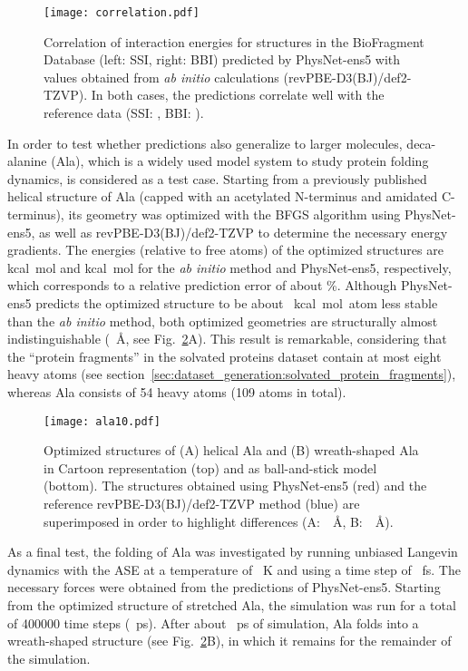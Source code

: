 \documentclass[12pt]{article}
\newcommand{\nn}{PhysNet}
\begin{document}
\begin{figure}[htbp]
\centering
\texttt{[image: correlation.pdf]}
\caption{Correlation of interaction energies for structures in the
  BioFragment Database\cite{burns2017biofragment} (left: SSI, right:
  BBI) predicted by \nn-ens5 with values obtained from \textit{ab
    initio} calculations (revPBE-D3(BJ)/def2-TZVP). In both cases, the
  predictions correlate well with the reference data (SSI:
  , BBI: ).}
\label{fig:ssi_bbi_correlation}
\end{figure}

In order to test whether predictions also generalize to larger
molecules, deca-alanine (Ala), which is a widely used model
system to study protein folding
dynamics,\cite{hazel2014thermodynamics} is considered as a test
case. Starting from a previously published helical structure of
Ala (capped with an acetylated N-terminus and amidated
C-terminus),\cite{park2003free} its geometry was optimized with the
BFGS algorithm\cite{fletcher2013practical} using \nn-ens5, as well as
revPBE-D3(BJ)/def2-TZVP to determine the necessary energy
gradients. The energies (relative to free atoms) of the optimized
structures are  kcal~mol and 
kcal~mol for the \textit{ab initio} method and \nn-ens5,
respectively, which corresponds to a relative prediction error of
about \%. Although \nn-ens5 predicts the optimized structure to
be about ~kcal~mol~atom less stable than the
\textit{ab initio} method, both optimized geometries are structurally
almost indistinguishable (~\AA, see
Fig.~\ref{fig:decaala}A). This result is remarkable, considering that
the ``protein fragments'' in the solvated proteins dataset contain at
most eight heavy atoms (see
section~\ref{sec:dataset_generation:solvated_protein_fragments}),
whereas Ala consists of \num{54} heavy atoms (\num{109} atoms
in total).

\begin{figure}[htbp]
\centering
\texttt{[image: ala10.pdf]}
\caption{Optimized structures of (A) helical Ala and (B)
  wreath-shaped Ala in Cartoon representation (top) and as
  ball-and-stick model (bottom). The structures obtained using
  \nn-ens5 (red) and the reference revPBE-D3(BJ)/def2-TZVP method
  (blue) are superimposed in order to highlight differences
  (A:~~\AA, B:~~\AA).}
\label{fig:decaala}
\end{figure}

As a final test, the folding of Ala was investigated by running
unbiased Langevin dynamics\cite{langevin1908theorie} with the
ASE\cite{larsen2017atomic} at a temperature of ~K and using a
time step of ~fs. The necessary forces were obtained from the
predictions of \nn-ens5. Starting from the optimized structure of
stretched Ala, the simulation was run for a total of
\num{400000} time steps (~ps). After about ~ps of simulation,
Ala folds into a wreath-shaped structure (see
Fig.~\ref{fig:decaala}B), in which it remains for the remainder of the
simulation.
\end{document}
